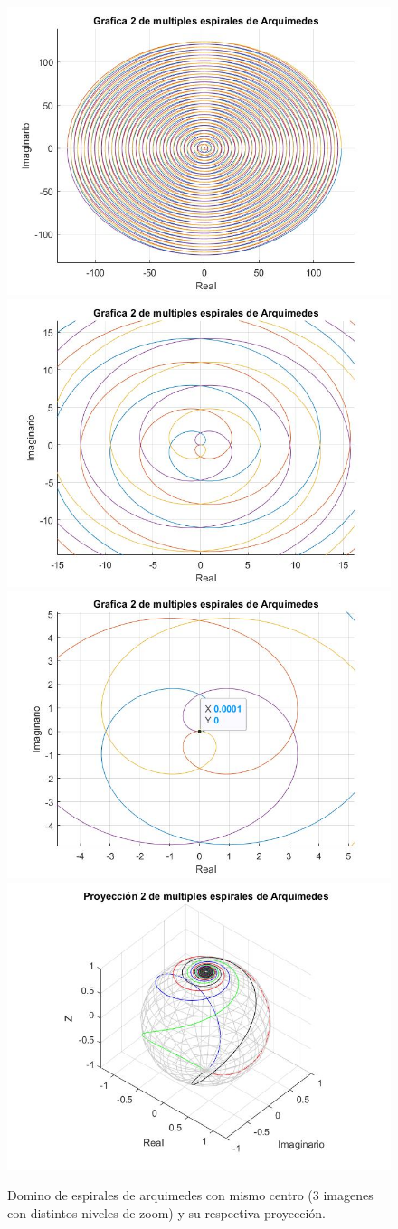 \documentclass[a4paper,12pt]{article}
\begin{document}
    \begin{figure}[H]
        \centering
        \includegraphics[width=0.49\linewidth]{grafica2EspiralesArquimedes_no_zoom.jpg}\\
        \includegraphics[width=0.49\linewidth]{grafica2EspiralesArquimedes_zoom_med.jpg}
        \includegraphics[width=0.49\linewidth]{grafica2EspiralesArquimedes_zoom.jpg}
        \includegraphics[width=0.49\linewidth]{grafica2EspiralesArquimedes_proyect1.jpg}
        \caption{Domino de espirales de arquimedes con mismo centro (3 imagenes con distintos niveles de zoom) y su respectiva proyección.}
    \end{figure}
    
\end{document}
